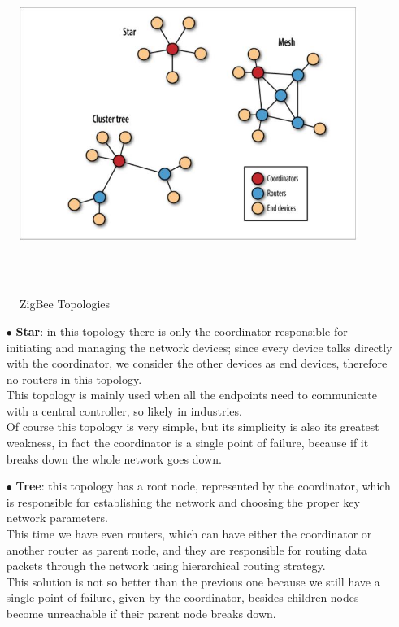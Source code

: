 \documentclass[12pt]{report}
\begin{document}
{\begin{figure}[H]
\includegraphics[width=11cm,height=11cm,keepaspectratio]{zigbee_topologies}
\centering
\caption{ZigBee Topologies}
\end{figure}

\begin{itemize}
\setlength{\itemindent}{+4mm}
\item[$\bullet$] \textbf{Star}: in this topology there is only the coordinator responsible for initiating and managing the network devices; since every device talks directly with the coordinator, we consider the other devices as end devices, therefore no routers in this topology.\\
This topology is mainly used when all the endpoints need to communicate with a central controller, so likely in industries.\\
Of course this topology is very simple, but its simplicity is also its greatest weakness, in fact the coordinator is a single point of failure, because if it breaks down the whole network goes down.

\item[$\bullet$] \textbf{Tree}: this topology has a root node, represented by the coordinator, which is responsible for establishing the network and choosing the proper key network parameters.\\
This time we have even routers, which can have either the coordinator or another router as parent node, and they are responsible for routing data packets through the network using hierarchical routing strategy.\\
This solution is not so better than the previous one because we still have a single point of failure, given by the coordinator, besides children nodes become unreachable if their parent node breaks down.


\end{itemize}}
\end{document}
